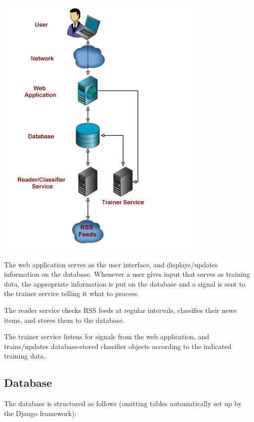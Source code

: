 \documentclass[letterpaper]{article}
\begin{document}
\noindent\includegraphics[width=4in]{arch-diagram.pdf}

The web application serves as the user interface, and displays/updates information on the database.
Whenever a user gives input that serves as training data, the appropriate information is put on the database and a signal is sent to the trainer service telling it what to process.

The reader service checks RSS feeds at regular intervals, classifies their news items, and stores them to the database.

The trainer service listens for signals from the web application, and trains/updates database-stored classifier objects according to the indicated training data.

\subsection{Database}
The database is structured as follows (omitting tables automatically set up by the Django framework):
\end{document}
